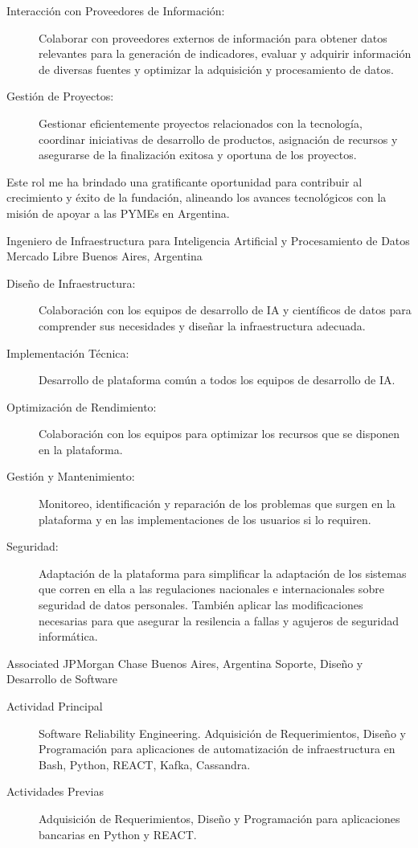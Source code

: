 {\begin{description}
		\item[Interacción con Proveedores de Información:] Colaborar con proveedores externos de información para obtener datos relevantes para la generación de indicadores, evaluar y adquirir información de diversas fuentes y optimizar la adquisición y procesamiento de datos.
		\item[Gestión de Proyectos:] Gestionar eficientemente proyectos relacionados con la tecnología, coordinar iniciativas de desarrollo de productos, asignación de recursos y asegurarse de la finalización exitosa y oportuna de los proyectos.
	\end{description}
	Este rol me ha brindado una gratificante oportunidad para contribuir al crecimiento y éxito de la fundación, alineando los avances tecnológicos con la misión de apoyar a las PYMEs en Argentina.
	}

	{Ingeniero de Infraestructura para Inteligencia Artificial y Procesamiento de Datos}
	{Mercado Libre}
	{Buenos Aires, Argentina}
	{}
	{\begin{description}
  \item[Diseño de Infraestructura:] Colaboración con los equipos de desarrollo de IA y científicos de datos para comprender sus necesidades y diseñar la infraestructura adecuada.
  \item[Implementación Técnica:] Desarrollo de plataforma común a todos los equipos de desarrollo de IA.
  \item[Optimización de Rendimiento:] Colaboración con los equipos para optimizar los recursos que se disponen en la plataforma.
  \item[Gestión y Mantenimiento:] Monitoreo, identificación y reparación de los problemas que surgen en la plataforma y en las implementaciones de los usuarios si lo requiren.
  \item[Seguridad:] Adaptación de la plataforma para simplificar la adaptación de los sistemas que corren en ella a las regulaciones nacionales e internacionales sobre seguridad de datos personales. También aplicar las modificaciones necesarias para que asegurar la resilencia a fallas y agujeros de seguridad informática.
\end{description}}


	{Associated}
	{JPMorgan Chase}
	{Buenos Aires, Argentina}
	{Soporte, Diseño y Desarrollo de Software}
	{\begin{description}
	\item [Actividad Principal] Software Reliability Engineering. Adquisición de Requerimientos, Diseño y Programación para aplicaciones de automatización de infraestructura en Bash, Python, REACT, Kafka, Cassandra.
	\item [Actividades Previas] Adquisición de Requerimientos, Diseño y Programación para aplicaciones bancarias en Python y REACT.
	\end{description}}

